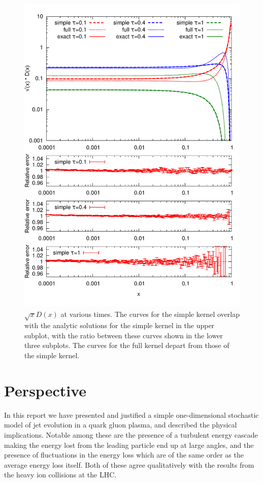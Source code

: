 \documentclass[a4paper,12pt]{article}
\numberwithin{equation}{section}
\begin{document}



\begin{figure}
\centering
\includegraphics[width=0.9\linewidth]{times.pdf}
\vspace*{-20pt}
\caption{$\sqrt{x} D(x)$ at various times. The curves for the simple kernel overlap with the analytic solutions for the simple kernel in the upper subplot, with the ratio between these curves shown in the lower three subplots. The curves for the full kernel depart from those of the simple kernel.}\label{Dtimes}
\end{figure}

\section{Perspective}\label{perspective}
In this report we have presented and justified a simple one-dimensional stochastic model of jet evolution in a quark gluon plasma, and described the physical implications. Notable among these are the presence of a turbulent energy cascade making the energy lost from the leading particle end up at large angles, and the presence of fluctuations in the energy loss which are of the same order as the average energy loss itself. Both of these agree qualitatively with the results from the heavy ion collisions at the LHC.
\end{document}
